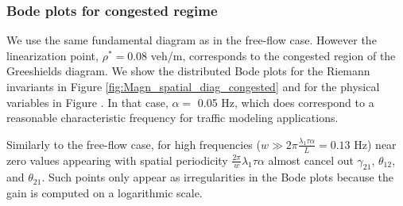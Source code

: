 \documentclass[preprint]{elsarticle}
\begin{document}

\subsubsection{Bode plots for congested regime}
We use the same fundamental diagram as in the free-flow case. However the linearization point, $\rho^* = 0.08$ veh/m, corresponds to the congested region of the Greeshields diagram. We show the distributed Bode plots for the Riemann invariants in Figure \ref{fig:Magn_spatial_diag_congested} and for the physical variables in Figure . In that case, $\alpha =$ 0.05 Hz, which does correspond to a reasonable characteristic frequency for traffic modeling applications.

Similarly to the free-flow case, for high frequencies ($w \gg 2 \pi \frac{\lambda_{1} \tau \alpha}{L} = 0.13$ Hz) near zero values appearing with spatial periodicity $\frac{2 \pi}{w} \lambda_{1} \tau \alpha$ almost cancel out $\gamma_{21}$, $\theta_{12}$, and $\theta_{21}$. Such points only appear as irregularities in the Bode plots because the gain is computed on a logarithmic scale.

\end{document}

